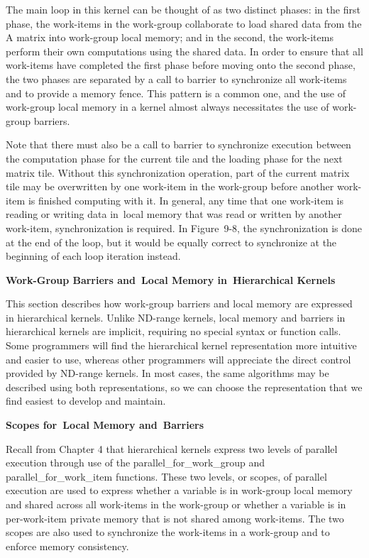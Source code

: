 The main loop in this kernel can be thought of as two distinct phases: in the first phase, the work-items in the work-group collaborate to load shared data from the A matrix into work-group local memory; and in the second, the work-items perform their own computations using the shared data. In order to ensure that all work-items have completed the first phase before moving onto the second phase, the two phases are separated by a call to barrier to synchronize all work-items and to provide a memory fence. This pattern is a common one, and the use of work-group local memory in a kernel almost always necessitates the use of work-group barriers.\par

Note that there must also be a call to barrier to synchronize execution between the computation phase for the current tile and the loading phase for the next matrix tile. Without this synchronization operation, part of the current matrix tile may be overwritten by one work-item in the work-group before another work-item is finished computing with it. In general, any time that one work-item is reading or writing data in local memory that was read or written by another work-item, synchronization is required. In Figure 9-8, the synchronization is done at the end of the loop, but it would be equally correct to synchronize at the beginning of each loop iteration instead.\par

\hspace*{\fill} \par %
\textbf{Work-Group Barriers and Local Memory in Hierarchical Kernels}

This section describes how work-group barriers and local memory are expressed in hierarchical kernels. Unlike ND-range kernels, local memory and barriers in hierarchical kernels are implicit, requiring no special syntax or function calls. Some programmers will find the hierarchical kernel representation more intuitive and easier to use, whereas other programmers will appreciate the direct control provided by ND-range kernels. In most cases, the same algorithms may be described using both representations, so we can choose the representation that we find easiest to develop and maintain.\par

\hspace*{\fill} \par %
\textbf{Scopes for Local Memory and Barriers}

Recall from Chapter 4 that hierarchical kernels express two levels of parallel execution through use of the parallel\_for\_work\_group and parallel\_for\_work\_item functions. These two levels, or scopes, of parallel execution are used to express whether a variable is in work-group local memory and shared across all work-items in the work-group or whether a variable is in per-work-item private memory that is not shared among work-items. The two scopes are also used to synchronize the work-items in a work-group and to enforce memory consistency.\par

